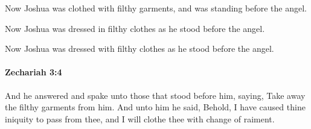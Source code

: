 			\begin{versebox}
					\item[BHS] 
					\item[LXX] 
					\item[ASV] Now Joshua was clothed with filthy garments, and was standing before the angel.
					\item[NIV] Now Joshua was dressed in filthy clothes as he stood before the angel.
					\item[NRSV] Now Joshua was dressed with filthy clothes as he stood before the angel.
			\end{versebox}

		\paragraph{Zechariah 3:4} %
			\label{ZECHARIAH-3-4}

			And he answered and spake unto those that stood before him, saying, Take away the filthy garments from him. And unto him he said, Behold, I have caused thine iniquity to pass from thee, and I will clothe thee with change of raiment.

